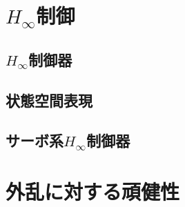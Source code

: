 \section{$H_\infty$制御}
\subsection{$H_\infty$制御器}
\subsection{状態空間表現}
\subsection{サーボ系$H_\infty$制御器}

\section{外乱に対する頑健性}

